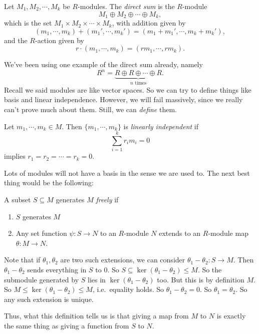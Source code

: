 \documentclass[a4paper]{article}
\begin{document}
\begin{defi}
  Let $M_1, M_2, \cdots, M_k$ be $R$-modules. The \emph{direct sum} is the $R$-module
  \[
    M_1 \oplus M_2 \oplus \cdots \oplus M_k,
  \]
  which is the set $M_1 \times M_2 \times \cdots \times M_k$, with addition given by
  \[
    (m_1, \cdots, m_k) + (m_1', \cdots, m_k') = (m_1 + m_1', \cdots, m_k + m_k'),
  \]
  and the $R$-action given by
  \[
    r\cdot (m_1, \cdots, m_k) = (rm_1, \cdots, rm_k).
  \]
\end{defi}
We've been using one example of the direct sum already, namely
\[
  R^n = \underbrace{R \oplus R \oplus \cdots \oplus R}_{n\text{ times}}.
\]
Recall we said modules are like vector spaces. So we can try to define things like basis and linear independence. However, we will fail massively, since we really can't prove much about them. Still, we can \emph{define} them.

\begin{defi}
  Let $m_1, \cdots, m_k \in M$. Then $\{m_1, \cdots, m_k\}$ is \emph{linearly independent} if
  \[
    \sum_{i = 1}^k r_i m_i = 0
  \]
  implies $r_1 = r_2 = \cdots = r_k = 0$.
\end{defi}

Lots of modules will not have a basis in the sense we are used to. The next best thing would be the following:
\begin{defi}
  A subset $S \subseteq M$ generates $M$ \emph{freely} if
  \begin{enumerate}
    \item $S$ generates $M$
    \item Any set function $\psi: S \to N$ to an $R$-module $N$ extends to an $R$-module map $\theta: M \to N$.
  \end{enumerate}
\end{defi}
Note that if $\theta_1, \theta_2$ are two such extensions, we can consider $\theta_1 - \theta_2: S \to M$. Then $\theta_1 - \theta_2$ sends everything in $S$ to $0$. So $S \subseteq \ker (\theta_1 - \theta_2) \leq M$. So the submodule generated by $S$ lies in $\ker (\theta_1 - \theta_2)$ too. But this is by definition $M$. So $M \leq \ker(\theta_1 - \theta_2) \leq M$, i.e.\ equality holds. So $\theta_1 - \theta_2 = 0$. So $\theta_1 = \theta_2$. So any such extension is unique.

Thus, what this definition tells us is that giving a map from $M$ to $N$ is exactly the same thing as giving a function from $S$ to $N$.
\end{document}
